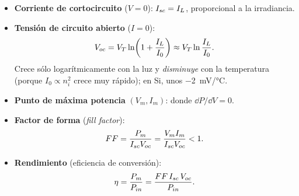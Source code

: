 \begin{clave}
\begin{itemize}[nosep]
  \item \textbf{Corriente de cortocircuito} ($V=0$): $I_{sc} = I_L$, proporcional a la
  irradiancia.
  \item \textbf{Tensión de circuito abierto} ($I=0$):
  \[
    V_{oc} = V_T\ln\!\left(1+\frac{I_L}{I_0}\right)\approx V_T\ln\frac{I_L}{I_0}.
  \]
  Crece sólo logarítmicamente con la luz y \emph{disminuye} con la temperatura (porque
  $I_0\propto n_i^2$ crece muy rápido); en Si, unos \SI{-2}{mV/\celsius}.
  \item \textbf{Punto de máxima potencia} $(V_m,I_m)$: donde $\dd P/\dd V=0$.
  \item \textbf{Factor de forma} (\emph{fill factor}):
  \[
    FF = \frac{P_m}{I_{sc}V_{oc}} = \frac{V_mI_m}{I_{sc}V_{oc}} < 1 .
  \]
  \item \textbf{Rendimiento} (eficiencia de conversión):
  \[
    \eta = \frac{P_m}{P_{in}} = \frac{FF\,I_{sc}\,V_{oc}}{P_{in}} .
  \]
\end{itemize}
\end{clave}

